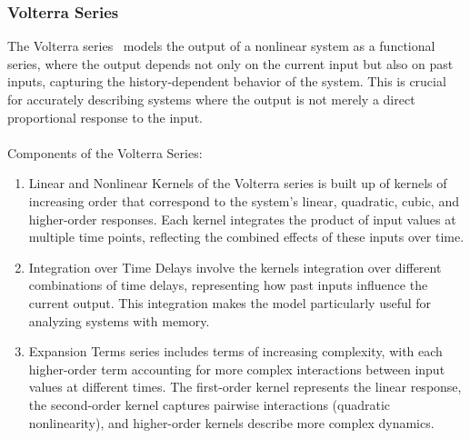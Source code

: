 \documentclass[12pt]{article}
\begin{document}
\subsubsection{Volterra Series}
The Volterra series~\cite{wiener1958} models the output of a nonlinear system as a functional series,
where the output depends not only on the current input but also on past inputs, capturing
the history-dependent behavior of the system. This is crucial for accurately describing
systems where the output is not merely a direct proportional response to the input.\\
\\
Components of the Volterra Series:\\
\begin{enumerate}
\item Linear and Nonlinear Kernels of the Volterra series is built up of kernels of
increasing order that correspond to the system's linear, quadratic, cubic, and
higher-order responses. Each kernel integrates the product of input values at multiple
time points, reflecting the combined effects of these inputs over time.
\item Integration over Time Delays involve the kernels integration over different combinations
of time delays, representing how past inputs influence the current output.
This integration makes the model particularly useful for analyzing systems with memory.\\
\item Expansion Terms series includes terms of increasing complexity, with each
higher-order term accounting for more complex interactions between input values
at different times. The first-order kernel represents the linear response, the
second-order kernel captures pairwise interactions (quadratic nonlinearity), and
higher-order kernels describe more complex dynamics.
\end{enumerate}
\end{document}
